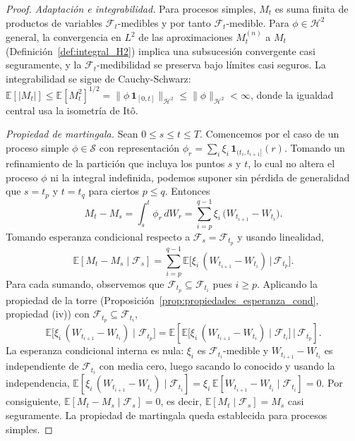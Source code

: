 \documentclass[11pt,a4paper,oneside]{report}
\theoremstyle{plain}
\theoremstyle{definition}
\theoremstyle{remark}
\newcommand{\E}{\mathbb{E}}
\newcommand{\F}{\mathcal{F}}
\newcommand{\1}{\mathbf{1}}
\begin{document}
\begin{proof}
\emph{Adaptación e integrabilidad.} Para procesos simples, $M_t$ es
suma finita de productos de variables $\F_t$-medibles y por tanto
$\F_t$-medible. Para $\phi \in \mathcal{H}^2$ general, la convergencia
en $L^2$ de las aproximaciones $M_t^{(n)}$ a $M_t$
(Definición~\ref{def:integral_H2}) implica una subsucesión convergente
casi seguramente, y la $\F_t$-medibilidad se preserva bajo límites
casi seguros. La integrabilidad se sigue de Cauchy-Schwarz:
$\E[|M_t|] \leq \E[M_t^2]^{1/2} = \|\phi\, \mathbf{1}_{[0,
t]}\|_{\mathcal{H}^2} \leq \|\phi\|_{\mathcal{H}^2} < \infty$, donde
la igualdad central usa la isometría de Itô.

\emph{Propiedad de martingala.} Sean $0 \leq s \leq t \leq T$.
Comencemos por el caso de un proceso simple $\phi \in \mathcal{S}$ con
representación $\phi_r = \sum_i \xi_i\, \mathbf{1}_{(t_i, t_{i+1}]}(r)$.
Tomando un refinamiento de la partición que incluya los puntos $s$ y
$t$, lo cual no altera el proceso $\phi$ ni la integral indefinida,
podemos suponer sin pérdida de generalidad que $s = t_p$ y $t = t_q$
para ciertos $p \leq q$. Entonces
\begin{equation*}
  M_t - M_s = \int_s^t \phi_r\, dW_r
            = \sum_{i = p}^{q-1} \xi_i\,
              \bigl(W_{t_{i+1}} - W_{t_i}\bigr).
\end{equation*}
Tomando esperanza condicional respecto a $\F_s = \F_{t_p}$ y usando
linealidad,
\begin{equation*}
  \E[M_t - M_s \mid \F_s]
  = \sum_{i = p}^{q-1} \E\bigl[\xi_i\, (W_{t_{i+1}} - W_{t_i})
                               \,\big|\, \F_{t_p}\bigr].
\end{equation*}
Para cada sumando, observemos que $\F_{t_p} \subseteq \F_{t_i}$ pues $i
\geq p$. Aplicando la propiedad de la torre
(Proposición~\ref{prop:propiedades_esperanza_cond}, propiedad (iv))
con $\F_{t_p} \subseteq \F_{t_i}$,
\begin{equation*}
  \E\bigl[\xi_i\, (W_{t_{i+1}} - W_{t_i}) \mid \F_{t_p}\bigr]
  = \E\!\left[\E\bigl[\xi_i\, (W_{t_{i+1}} - W_{t_i})
                       \mid \F_{t_i}\bigr] \,\Big|\, \F_{t_p}\right].
\end{equation*}
La esperanza condicional interna es nula: $\xi_i$ es $\F_{t_i}$-medible
y $W_{t_{i+1}} - W_{t_i}$ es independiente de $\F_{t_i}$ con media
cero, luego sacando lo conocido y usando la independencia,
$\E[\xi_i\, (W_{t_{i+1}} - W_{t_i}) \mid \F_{t_i}] = \xi_i\,
\E[W_{t_{i+1}} - W_{t_i} \mid \F_{t_i}] = 0$. Por consiguiente,
$\E[M_t - M_s \mid \F_s] = 0$, es decir, $\E[M_t \mid \F_s] = M_s$
casi seguramente. La propiedad de martingala queda establecida para
procesos simples.


\end{proof}
\end{document}

